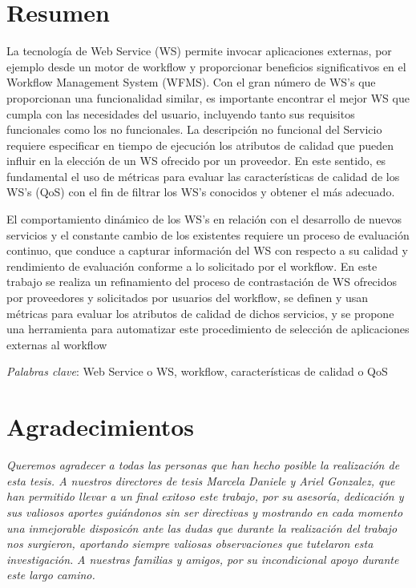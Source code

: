 \chapter*{Resumen}


La tecnología de Web Service (WS) permite invocar aplicaciones externas, por ejemplo desde un motor de workflow y proporcionar beneficios significativos en el Workflow Management System (WFMS). Con el gran número de WS's que proporcionan una funcionalidad similar, es importante encontrar el mejor WS que cumpla con las necesidades del usuario, incluyendo tanto sus requisitos funcionales como los no funcionales. 
La descripción no funcional del Servicio requiere especificar en tiempo de ejecución los atributos de calidad que pueden influir en la elección de un WS ofrecido por un proveedor. En este sentido, es fundamental el uso de métricas para evaluar las características de calidad de los WS's (QoS) con el fin de filtrar los WS's conocidos y obtener el más adecuado.

El comportamiento dinámico de los WS’s en relación con el desarrollo de nuevos servicios y el constante cambio de los existentes requiere un proceso de evaluación continuo, que conduce a capturar información del WS con respecto a su calidad y rendimiento de evaluación conforme a lo solicitado por el workflow. En este trabajo se realiza un refinamiento del proceso de contrastación de WS ofrecidos por proveedores y solicitados por usuarios del workflow, se definen y usan métricas para evaluar los atributos de calidad de dichos servicios, y se propone una herramienta para automatizar este procedimiento de selección de aplicaciones externas al workflow

\emph{Palabras clave}: Web Service o WS, workflow, características de calidad o QoS

\thispagestyle{empty} %

\chapter*{Agradecimientos}

{\sl Queremos agradecer a todas las personas que han hecho posible la realización de esta tesis. A nuestros directores de tesis Marcela Daniele y Ariel Gonzalez, que han permitido llevar a un final exitoso este trabajo, por su asesoría, dedicación y sus valiosos aportes guiándonos sin ser directivas y mostrando en cada momento una inmejorable disposicón ante las dudas que durante la realización del trabajo nos surgieron, aportando siempre valiosas observaciones que tutelaron esta investigación.} {\sl A nuestras familias y amigos, por su incondicional apoyo durante este largo camino.}

